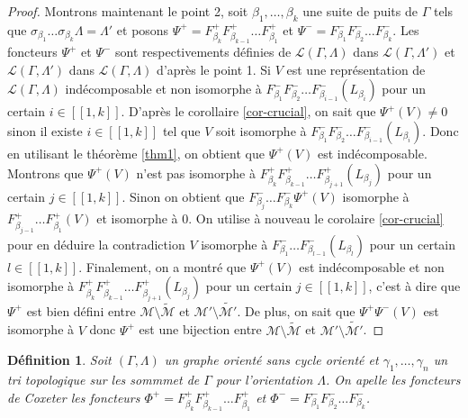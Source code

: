 \documentclass[a4paper,10pt]{article}
\newtheorem{defi}[]{Définition}[section]
\begin{document}
\begin{proof}
Montrons maintenant le point 2, soit $\beta_{1}, \dots, \beta_{k}$ une suite de puits de $\Gamma$ tels que $\sigma_{\beta_{1}}\dots\sigma_{\beta_{k}}\Lambda =  \Lambda'$ et posons $\Psi^{+} = F^{+}_{\beta_{k}}F^{+}_{\beta_{k-1}} \dots F^{+}_{\beta_{1}}$ et $\Psi^{-} = F^{-}_{\beta_{1}}F^{-}_{\beta_{2}} \dots F^{-}_{\beta_{k}}$. Les foncteurs $\Psi^{+}$ et $\Psi^{-}$ sont respectivements définies de $\mathscr L(\Gamma,\Lambda)$ dans $\mathscr L(\Gamma, \Lambda')$ et $\mathscr L(\Gamma,\Lambda')$ dans $\mathscr L(\Gamma, \Lambda)$ d'après le point 1.
Si $V$ est une représentation de $\mathscr L(\Gamma,\Lambda)$ indécomposable et non isomorphe à $F^{-}_{\beta_{1}}F^{-}_{\beta_{2}} \dots F^{-}_{\beta_{i-1}}(L_{\beta_{i}})$ pour un certain $i \in [\![1,k]\!]$. D'après le corollaire \ref{cor-crucial}, on sait que $\Psi^{+}(V) \neq 0$ sinon il existe $i \in [\![1,k]\!]$ tel que $V$ soit isomorphe  à $F^{-}_{\beta_{1}}F^{-}_{\beta_{2}} \dots F^{-}_{\beta_{i-1}}(L_{\beta_{i}})$.
Donc en utilisant le théorème \ref{thm1}, on obtient que $\Psi^{+}(V)$ est indécomposable. Montrons que $\Psi^{+}(V)$ n'est pas isomorphe à $F^{+}_{\beta_{k}}F^{+}_{\beta_{k-1}} \dots F^{+}_{\beta_{j+1}}(L_{\beta_{j}})$ pour un certain $j\in [\![1,k]\!]$. Sinon on obtient que $F^{-}_{\beta_{j}} \dots F^{-}_{\beta_{k}}\Psi^{+}(V)$ isomorphe à $F^{+}_{\beta_{j-1}} \dots F^{+}_{\beta_{1}}(V)$ et isomorphe à $0$. On utilise à nouveau le corolaire \ref{cor-crucial} pour en déduire la contradiction $V$ isomorphe à $F^{-}_{\beta_{1}} \dots F^{-}_{\beta_{l-1}}(L_{\beta_{l}})$ pour un certain $l \in [\![1,k]\!]$. Finalement, on a montré que $\Psi^{+}(V)$ est indécomposable et non isomorphe à $F^{+}_{\beta_{k}}F^{+}_{\beta_{k-1}} \dots F^{+}_{\beta_{j+1}}(L_{\beta_{j}})$ pour un certain $j\in [\![1,k]\!]$, c'est à dire que $\Psi^{+}$ est bien défini entre $\mathscr M \setminus \widetilde{\mathscr M}$ et  $\mathscr M' \setminus \widetilde{\mathscr M'}$. De plus, on sait que $\Psi^{+}\Psi^{-}(V)$ est isomorphe à $V$ donc $\Psi^{+}$ est une bijection entre $\mathscr M \setminus \widetilde{\mathscr M}$ et  $\mathscr M' \setminus \widetilde{\mathscr M'}$.
\end{proof}

\begin{defi}
	Soit $(\Gamma,\Lambda)$ un graphe orienté sans cycle orienté et $\gamma_{1}, \dots, \gamma_{n}$ un tri topologique sur les sommmet de $\Gamma$ pour l'orientation $\Lambda$. On apelle les \emph{foncteurs de Coxeter} les foncteurs $\Phi^{+} = F^{+}_{\beta_{k}}F^{+}_{\beta_{k-1}} \dots F^{+}_{\beta_{1}}$ et $\Phi^{-} = F^{-}_{\beta_{1}}F^{-}_{\beta_{2}} \dots F^{-}_{\beta_{k}}$.
\end{defi}
\end{document}
